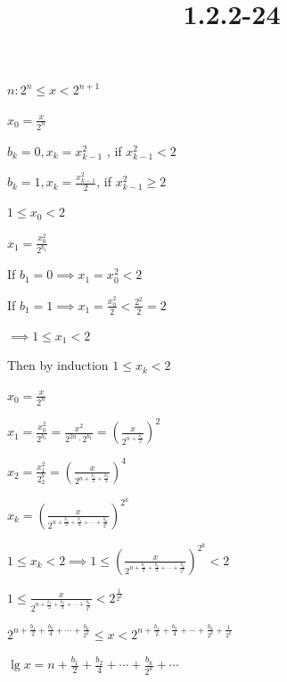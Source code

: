 \documentclass{article}
\title{1.2.2-24}
\begin{document}
\maketitle

$n: 2^n \leq x < 2^{n+1}$

$x_0 = \frac{x}{2^n}$

$b_k = 0, x_k = x_{k-1}^2$ , if $x_{k-1}^2 < 2$

$b_k = 1, x_k = \frac{x_{k-1}^2}{2}$, if $x_{k-1}^2 \geq 2$

$1 \leq x_0 < 2$

$x_1 = \frac{x_0^2}{2^{b_1}}$

If $b_1=0 \implies x_1 = x_0^2 < 2$

If $b_1=1 \implies x_1 = \frac{x_0^2}{2} < \frac{2^2}{2} = 2$

$\implies 1 \leq x_1 < 2$

Then by induction $1 \leq x_k < 2$

$x_0 = \frac{x}{2^n}$

$x_1 = \frac{x_0^2}{2^{b_1}} = \frac{x^2}{2^{2n}\cdot2^{b_1}} = (\frac{x}{2^{n+\frac{b_1}{2}}})^2$

$x_2 = \frac{x_1^2}{2^b_2} = (\frac{x}{2^{n+\frac{b_1}{2} + \frac{b_2}{4}}})^4$

$x_k = (\frac{x}{2^{n+\frac{b_1}{2} + \frac{b_2}{4} + \cdots + \frac{b_k}{2^k}}})^{2^k}$

$1 \leq x_k < 2 \implies 1 \leq (\frac{x}{2^{n+\frac{b_1}{2} + \frac{b_2}{4} + \cdots + \frac{b_k}{2^k}}})^{2^k} < 2$

$1 \leq \frac{x}{2^{n+\frac{b_1}{2} + \frac{b_2}{4} + \cdots + \frac{b_k}{2^k}}} < 2^{\frac{1}{2^k}}$

$2^{n+\frac{b_1}{2} + \frac{b_2}{4} + \cdots + \frac{b_k}{2^k}} \leq x < 2^{n+\frac{b_1}{2} + \frac{b_2}{4} + \cdots + \frac{b_k}{2^k} + \frac{1}{2^k}}$

$\lg{x} = n+\frac{b_1}{2} + \frac{b_2}{4} + \cdots + \frac{b_k}{2^k} + \cdots$
\end{document}
